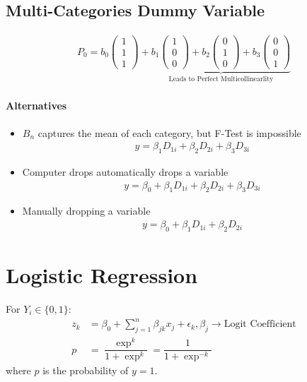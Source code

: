 \documentclass[openany, oneside]{book}
\begin{document}
\section{Multi-Categories Dummy Variable}
\begin{align}
	P_0 = b_0 \begin{pmatrix} 1 \\ 1 \\ 1\end{pmatrix} + \underbrace{b_1 \begin{pmatrix} 1 \\ 0 \\ 0\end{pmatrix} + b_2 \begin{pmatrix} 0 \\ 1 \\ 0\end{pmatrix} +b_3 \begin{pmatrix} 0 \\ 0 \\ 1\end{pmatrix}}_{\text{Leads to Perfect Multicollinearlity}}
\end{align}
\subsubsection{Alternatives}
\begin{itemize}
	\item $B_n$ captures the mean of each category, but F-Test is impossible\begin{align} y = \beta_1 D_{1i} + \beta_2 D_{2i} + \beta_3 D_{3i}\end{align}
	\item Computer drops automatically drops a variable \begin{align} y = \beta_0 + \beta_1 D_{1i} + \beta_2 D_{2i} + \beta_3 D_{3i} \end{align}
	\item Manually dropping a variable \begin{align} y = \beta_0 + \beta_1 D_{1i} + \beta_2 D_{2i} \end{align}
\end{itemize}

\chapter{Logistic Regression}
For $Y_i \in \lbrace 0,1 \rbrace$:
\begin{align}
	z_k &= \beta_0 + \sum_{j=1}^{n} \beta_{jk} x_j + \epsilon_k, \beta_j \rightarrow \text{Logit Coefficient}\\
	p &= \dfrac{\exp^{k}}{1+\exp^{k}} = \dfrac{1}{1+\exp^{-k}}
\end{align}
where $p$ is the probability of $y=1$.
\end{document}
